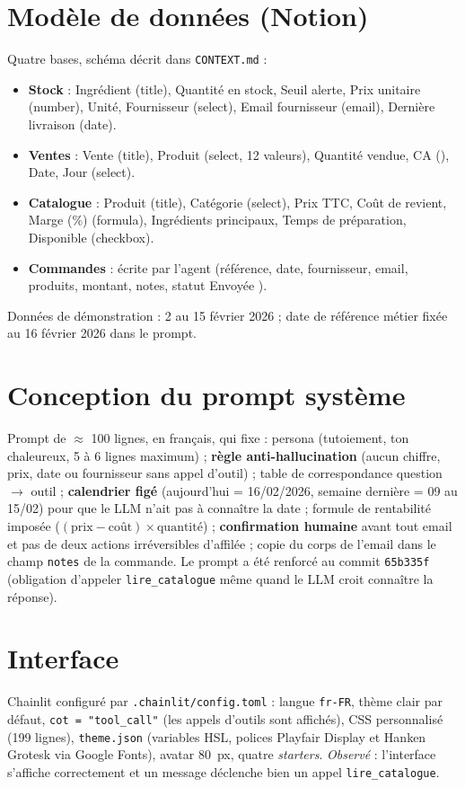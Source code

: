 \documentclass[10.5pt,a4paper]{article}
\newcommand{\code}[1]{\texttt{#1}}
\begin{document}
\section{Modèle de données (Notion)}
Quatre bases, schéma décrit dans \code{CONTEXT.md} :
\begin{itemize}
  \item \textbf{Stock} : Ingrédient (title), Quantité en stock, Seuil alerte, Prix unitaire (number), Unité, Fournisseur (select), Email fournisseur (email), Dernière livraison (date).
  \item \textbf{Ventes} : Vente (title), Produit (select, 12 valeurs), Quantité vendue, CA (\texteuro), Date, Jour (select).
  \item \textbf{Catalogue} : Produit (title), Catégorie (select), Prix TTC, Coût de revient, Marge (\%) (formula), Ingrédients principaux, Temps de préparation, Disponible (checkbox).
  \item \textbf{Commandes} : écrite par l'agent (référence, date, fournisseur, email, produits, montant, notes, statut \og Envoyée \fg).
\end{itemize}
Données de démonstration : 2 au 15 février 2026 ; date de référence métier fixée au 16 février 2026 dans le prompt.

\section{Conception du prompt système}
Prompt de $\approx$ 100 lignes, en français, qui fixe : persona (tutoiement, ton chaleureux, 5 à 6 lignes maximum) ; \textbf{règle anti-hallucination} (aucun chiffre, prix, date ou fournisseur sans appel d'outil) ; table de correspondance question $\to$ outil ; \textbf{calendrier figé} (\og aujourd'hui \fg{} = 16/02/2026, \og semaine dernière \fg{} = 09 au 15/02) pour que le LLM n'ait pas à connaître la date ; formule de rentabilité imposée ($(\text{prix}-\text{coût})\times\text{quantité}$) ; \textbf{confirmation humaine} avant tout email et pas de deux actions irréversibles d'affilée ; copie du corps de l'email dans le champ \code{notes} de la commande. Le prompt a été renforcé au commit \code{65b335f} (obligation d'appeler \code{lire\_catalogue} même quand le LLM croit connaître la réponse).

\section{Interface}
Chainlit configuré par \code{.chainlit/config.toml} : langue \code{fr-FR}, thème clair par défaut, \code{cot = "tool\_call"} (les appels d'outils sont affichés), CSS personnalisé (199 lignes), \code{theme.json} (variables HSL, polices Playfair Display et Hanken Grotesk via Google Fonts), avatar 80~px, quatre \emph{starters}. \textit{Observé} : l'interface s'affiche correctement et un message déclenche bien un appel \code{lire\_catalogue}.
\end{document}
